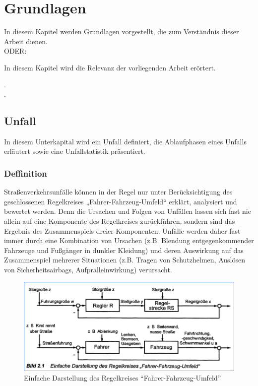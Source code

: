 \chapter{Grundlagen}
In diesem Kapitel werden Grundlagen vorgestellt, die zum Verständnis dieser Arbeit dienen.\\
ODER:

In diesem Kapitel wird die Relevanz der vorliegenden Arbeit erörtert.

.\\


.
\\



%
%
\section{Unfall}
In diesem Unterkapital wird ein Unfall definiert, die Ablaufphasen eines Unfalls erläutert sowie eine Unfallstatistik präsentiert.
%
%
%
%
\subsection{Deffinition}
Straßenverkehrsunfälle können in der Regel nur unter Berücksichtigung des geschlossenen Regelkreises „Fahrer-Fahrzeug-Umfeld“ erklärt, analysiert und bewertet werden. Denn die Ursachen und Folgen von Unfällen lassen sich fast nie allein auf eine Komponente des Regelkreises zurückführen, sondern sind das Ergebnis des Zusammenspiels dreier Komponenten. Unfälle werden daher fast immer durch eine Kombination von Ursachen (z.B. Blendung entgegenkommender Fahrzeuge und Fußgänger in dunkler Kleidung) und deren Auswirkung auf das Zusammenspiel mehrerer Situationen (z.B. Tragen von Schutzhelmen, Auslösen von Sicherheitsairbags, Aufpralleinwirkung) verursacht. \cite{Appel2002}

\begin{figure}[H]
	\centering
	\includegraphics[width=\linewidth]{Bilder/FahrenRegelkreis.png}
	\caption{Einfache Darstellung des Regelkreises \textquotedblleft Fahrer-Fahrzeug-Umfeld\textquotedblright \cite{Appel2002}}
	\label{fig:FahrenRegelkreis}
\end{figure}

